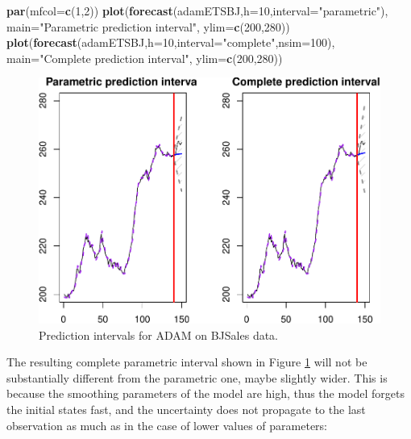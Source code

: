 \documentclass[]{book}
\newenvironment{Shaded}{\begin{snugshade}}{\end{snugshade}}
\newcommand{\DataTypeTok}[1]{\textcolor[rgb]{0.13,0.29,0.53}{#1}}
\newcommand{\DecValTok}[1]{\textcolor[rgb]{0.00,0.00,0.81}{#1}}
\newcommand{\KeywordTok}[1]{\textcolor[rgb]{0.13,0.29,0.53}{\textbf{#1}}}
\newcommand{\NormalTok}[1]{#1}
\newcommand{\StringTok}[1]{\textcolor[rgb]{0.31,0.60,0.02}{#1}}
\theoremstyle{definition}
\theoremstyle{definition}
\theoremstyle{definition}
\theoremstyle{definition}
\theoremstyle{remark}
\begin{document}
\begin{Shaded}
\begin{Highlighting}[]
\KeywordTok{par}\NormalTok{(}\DataTypeTok{mfcol=}\KeywordTok{c}\NormalTok{(}\DecValTok{1}\NormalTok{,}\DecValTok{2}\NormalTok{))}
\KeywordTok{plot}\NormalTok{(}\KeywordTok{forecast}\NormalTok{(adamETSBJ,}\DataTypeTok{h=}\DecValTok{10}\NormalTok{,}\DataTypeTok{interval=}\StringTok{"parametric"}\NormalTok{),}
     \DataTypeTok{main=}\StringTok{"Parametric prediction interval"}\NormalTok{, }\DataTypeTok{ylim=}\KeywordTok{c}\NormalTok{(}\DecValTok{200}\NormalTok{,}\DecValTok{280}\NormalTok{))}
\KeywordTok{plot}\NormalTok{(}\KeywordTok{forecast}\NormalTok{(adamETSBJ,}\DataTypeTok{h=}\DecValTok{10}\NormalTok{,}\DataTypeTok{interval=}\StringTok{"complete"}\NormalTok{,}\DataTypeTok{nsim=}\DecValTok{100}\NormalTok{),}
     \DataTypeTok{main=}\StringTok{"Complete prediction interval"}\NormalTok{, }\DataTypeTok{ylim=}\KeywordTok{c}\NormalTok{(}\DecValTok{200}\NormalTok{,}\DecValTok{280}\NormalTok{))}
\end{Highlighting}
\end{Shaded}

\begin{figure}
\centering
\includegraphics{Svetunkov--2022----ADAM_files/figure-latex/adamModelPIComplete-1.pdf}
\caption{\label{fig:adamModelPIComplete}Prediction intervals for ADAM on BJSales data.}
\end{figure}

The resulting complete parametric interval shown in Figure \ref{fig:adamModelPIComplete} will not be substantially different from the parametric one, maybe slightly wider. This is because the smoothing parameters of the model are high, thus the model forgets the initial states fast, and the uncertainty does not propagate to the last observation as much as in the case of lower values of parameters:
\end{document}
